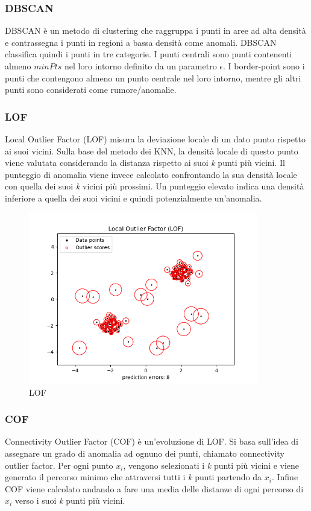\subsubsection{DBSCAN}
DBSCAN è un metodo di clustering che raggruppa i punti in aree ad alta densità e contrassegna i punti in regioni a bassa densità come anomali.
DBSCAN classifica quindi i punti in tre categorie. I punti centrali sono punti
contenenti almeno $minPts$ nel loro intorno definito da un parametro $\epsilon$. I border-point sono i punti che contengono almeno un punto centrale nel loro intorno, mentre gli altri punti sono considerati come rumore/anomalie. 


\subsubsection{LOF}
Local Outlier Factor (LOF) misura la deviazione locale di un dato punto rispetto ai suoi vicini. Sulla base del metodo dei KNN, la densità locale di questo punto viene valutata considerando la distanza rispetto ai suoi \textit{k} punti più vicini. Il punteggio di anomalia viene invece calcolato confrontando la sua densità locale con quella dei suoi \textit{k} vicini più prossimi. Un punteggio elevato indica una densità inferiore a quella dei suoi vicini e quindi potenzialmente un'anomalia.
\begin{figure}[t]
	\centering
	\includegraphics[width=10cm, scale=1]{images/lof}
	\caption{LOF}
	\label{lof}
\end{figure}

\subsubsection{COF}
Connectivity Outlier Factor (COF) è un'evoluzione di LOF. Si basa sull'idea di assegnare un grado di anomalia ad ognuno dei punti, chiamato connectivity outlier factor.
Per ogni punto $x_i$, vengono selezionati i \textit{k} punti più vicini e viene generato il percorso minimo che attraversi tutti i \textit{k} punti partendo da $x_i$. Infine COF viene calcolato andando a fare una media delle distanze di ogni percorso di $x_i$ verso i suoi \textit{k} punti più vicini.

